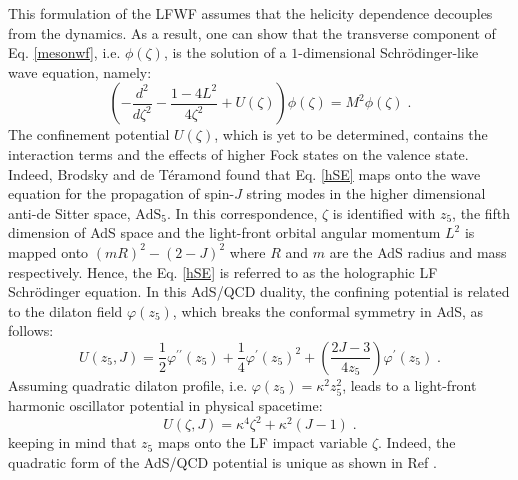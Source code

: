 \documentclass{PoS}
\begin{document}
This formulation of the LFWF assumes that the helicity dependence decouples from the dynamics.  As a result, one can show that the transverse component of Eq. \eqref{mesonwf}, i.e. $\phi (\zeta)$, is the solution of a $1$-dimensional Schr\"odinger-like wave equation, namely: 
\begin{equation}
	\left(-\frac{d^2}{d\zeta^2} - \frac{1-4L^2}{4\zeta^2} + U(\zeta) \right) \phi(\zeta) = M^2 \phi(\zeta) \;.
	\label{hSE}
\end{equation} 
The confinement potential $U(\zeta)$, which is yet to be determined, contains the interaction terms and the effects of higher Fock states on the valence state.  Indeed, Brodsky and de T\'eramond \cite{deTeramond:2008ht,Brodsky:2006uqa,deTeramond:2005su,Brodsky:2007hb} found that Eq. \eqref{hSE} maps onto the wave equation for the propagation of spin-$J$ string modes in the higher dimensional anti-de Sitter space, $\text{AdS}_5$.  In this correspondence, $\zeta$ is identified with $z_5$, the fifth dimension of AdS space and the light-front orbital angular momentum $L^2$ is mapped onto $(mR)^2-(2-J)^2$  where $R$ and $m$ are the AdS radius and mass respectively. Hence, the Eq. \eqref{hSE} is referred to as the holographic LF Schr\"odinger equation. In this AdS/QCD duality, the confining potential is related to the dilaton field $\varphi(z_5)$, which breaks the conformal symmetry in AdS, as follows:
\begin{equation}
	U(z_5, J)= \frac{1}{2} \varphi^{\prime\prime}(z_5) + \frac{1}{4} \varphi^{\prime}(z_5)^2 + \left(\frac{2J-3}{4 z_5} \right)\varphi^{\prime} (z_5) \;.
\end{equation}
Assuming quadratic dilaton profile, i.e.  $\varphi(z_5)=\kappa^2 z_5^2$, leads to a light-front harmonic oscillator potential in physical spacetime:
\begin{equation}
	U(\zeta,J)= \kappa^4 \zeta^2 + \kappa^2 (J-1) \;.
	\label{harmonic-LF}
\end{equation}
keeping in mind that $z_5$ maps onto the LF impact variable $\zeta$. Indeed, the quadratic form of the AdS/QCD potential is unique as shown in Ref \cite{Brodsky:2013ar}.
\end{document}
